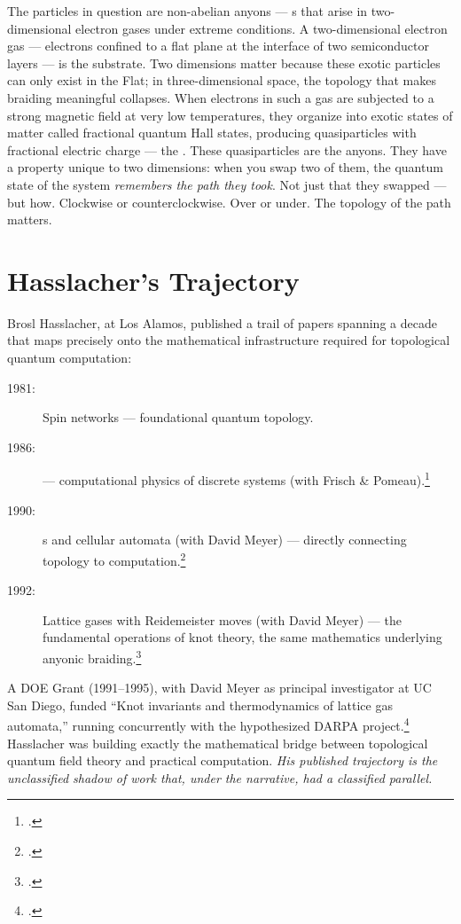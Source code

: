 The particles in question are non-abelian \glspl{anyon} --- s that arise in two-dimensional electron gases under extreme conditions. A two-dimensional electron gas --- electrons confined to a flat plane at the interface of two semiconductor layers --- is the substrate. Two dimensions matter because these exotic particles can only exist in the Flat; in three-dimensional space, the topology that makes braiding meaningful collapses. When electrons in such a gas are subjected to a strong magnetic field at very low temperatures, they organize into exotic states of matter called fractional quantum Hall states, producing quasiparticles with fractional electric charge --- the . These quasiparticles are the anyons. They have a property unique to two dimensions: when you swap two of them, the quantum state of the system \textit{remembers the path they took}. Not just that they swapped --- but how. Clockwise or counterclockwise. Over or under. The topology of the path matters.

\section*{Hasslacher's Trajectory}
\label{spine:braid-hasslachers-trajectory}

Brosl Hasslacher, at Los Alamos, published a trail of papers spanning a decade that maps precisely onto the mathematical infrastructure required for topological quantum computation:

\begin{description}
\item[1981:] Spin networks --- foundational quantum topology.
\item[1986:]  --- computational physics of discrete systems (with Frisch \& Pomeau).\footcite{frisch1986}
\item[1990:] s and cellular automata (with David Meyer) --- directly connecting topology to computation.\footcite{hasslacher1990}
\item[1992:] Lattice gases with Reidemeister moves (with David Meyer) --- the fundamental operations of knot theory, the same mathematics underlying anyonic braiding.\footcite{hasslacher1992}
\end{description}

A DOE Grant (1991--1995), with David Meyer as principal investigator at UC San Diego, funded ``Knot invariants and thermodynamics of lattice gas automata,'' running concurrently with the hypothesized DARPA project.\footcite{meyer1995doe} Hasslacher was building exactly the mathematical bridge between topological quantum field theory and practical computation. \textit{His published trajectory is the unclassified shadow of work that, under the narrative, had a classified parallel.}

